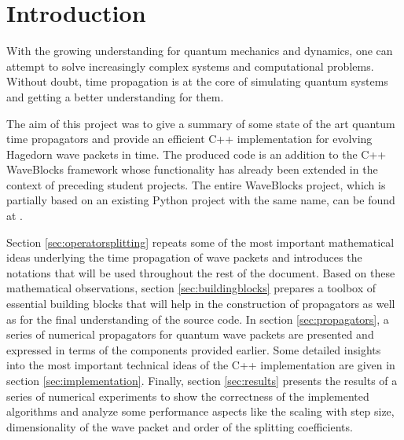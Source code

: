 \section*{Introduction}
%
With the growing understanding for quantum mechanics and dynamics, one can attempt to solve increasingly complex systems and computational problems.
Without doubt, time propagation is at the core of simulating quantum systems and getting a better understanding for them.
\par\medskip
%
The aim of this project was to give a summary of some state of the art quantum time propagators and provide an efficient C++ implementation for evolving Hagedorn wave packets in time.
The produced code is an addition to the C++ WaveBlocks framework whose functionality has already been extended in the context of preceding student projects.
The entire WaveBlocks project, which is partially based on an existing Python project with the same name, can be found at \cite{libwaveblocks}.
\par\medskip
%
Section \ref{sec:operatorsplitting} repeats some of the most important mathematical ideas underlying the time propagation of wave packets and introduces the notations that will be used throughout the rest of the document.
Based on these mathematical observations, section \ref{sec:buildingblocks} prepares a toolbox of essential building blocks that will help in the construction of propagators as well as for the final understanding of the source code.
In section \ref{sec:propagators}, a series of numerical propagators for quantum wave packets are presented and expressed in terms of the components provided earlier.
Some detailed insights into the most important technical ideas of the C++ implementation are given in section \ref{sec:implementation}.
Finally, section \ref{sec:results} presents the results of a series of numerical experiments to show the correctness of the implemented algorithms and analyze some performance aspects like the scaling with step size, dimensionality of the wave packet and order of the splitting coefficients.
